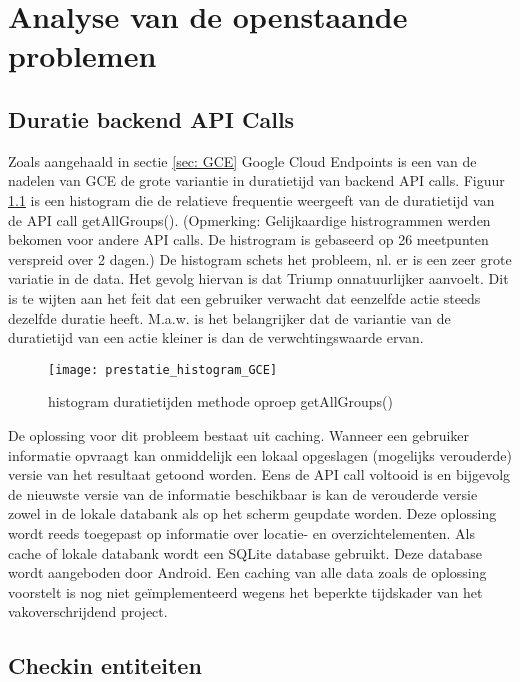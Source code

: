 
\chapter{Analyse van de openstaande problemen}

\section{Duratie backend API Calls}

Zoals aangehaald in sectie \ref{sec: GCE} Google Cloud Endpoints is een van de nadelen van GCE de grote variantie in duratietijd van backend API calls. Figuur \ref{fig:hist_getAllGroups} is een histogram die de relatieve frequentie weergeeft van de duratietijd van de API call getAllGroups(). (Opmerking: Gelijkaardige histrogrammen werden bekomen voor andere API calls. De histrogram is gebaseerd op 26 meetpunten verspreid over 2 dagen.) De histogram schets het probleem, nl. er is een zeer grote variatie in de data. Het gevolg hiervan is dat Triump onnatuurlijker aanvoelt. Dit is te wijten aan het feit dat een gebruiker verwacht dat eenzelfde actie steeds dezelfde duratie heeft. M.a.w. is het belangrijker dat de variantie van de duratietijd van een actie kleiner is dan de verwchtingswaarde ervan.

\begin{figure}[H]
	\centering
	\texttt{[image: prestatie\_histogram\_GCE]}
	\caption{histogram duratietijden methode oproep getAllGroups()}
	\label{fig:hist_getAllGroups}
\end{figure}

De oplossing voor dit probleem bestaat uit caching. Wanneer een gebruiker informatie opvraagt kan onmiddelijk een lokaal opgeslagen (mogelijks verouderde) versie van het resultaat getoond worden. Eens de API call voltooid is en bijgevolg de nieuwste versie van de informatie beschikbaar is kan de verouderde versie zowel in de lokale databank als op het scherm geupdate worden. Deze oplossing wordt reeds toegepast op informatie over locatie- en overzichtelementen. Als cache of lokale databank wordt een SQLite database gebruikt. Deze database wordt aangeboden door Android. Een caching van alle data zoals de oplossing voorstelt is nog niet geïmplementeerd wegens het beperkte tijdskader van het vakoverschrijdend project.

\section{Checkin entiteiten}

